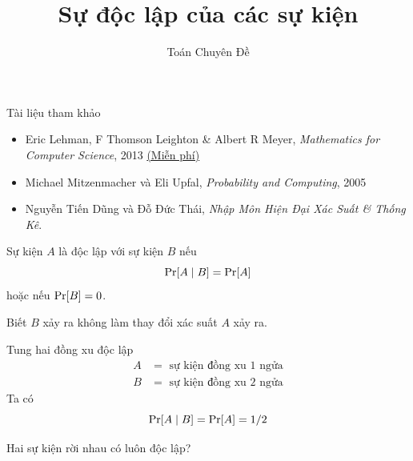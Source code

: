 
\title{Sự độc lập của các sự kiện} 
 \author{Toán Chuyên Đề}
 
\maketitle

\begin{frame}{Tài liệu tham khảo}  
  \begin{itemize}
  \item Eric Lehman, F Thomson Leighton \& Albert R Meyer,
    \textit{Mathematics for Computer Science}, 2013
    \href{https://www.seas.harvard.edu/courses/cs20/MIT6_042Notes.pdf}{\color{blue}(Miễn
    phí)}
  \item Michael Mitzenmacher và Eli Upfal, \textit{Probability and Computing}, 2005
  \item  Nguyễn Tiến Dũng và Đỗ Đức Thái, \textit{Nhập Môn Hiện Đại Xác Suất \& Thống Kê}.
  \end{itemize}
\end{frame} 

\begin{frame}
	\begin{dfntn}
		Sự kiện $A$ là độc lập với sự kiện $B$ nếu
		\[
			\mathrm{Pr}[A\mid B] = \mathrm{Pr}[A]
		\]
		hoặc nếu $\mathrm{Pr}[B] = 0$.
	\end{dfntn}
	Biết $B$ xảy ra không làm thay đổi xác suất  $A$ xảy ra.
\end{frame}

\begin{frame}
	\begin{xmpl}
		Tung hai đồng xu độc lập 
		\begin{align*}
			A &= \text{ sự kiện đồng xu $1$ ngửa}\\
			B &= \text{ sự kiện đồng xu $2$ ngửa}
		\end{align*}
	Ta có
	\[
		\mathrm{Pr}[A\mid B] = \mathrm{Pr}[A] = 1/2
	\]
	\end{xmpl}
	
\end{frame}

\begin{frame}
	\begin{qstn}
		Hai sự kiện rời nhau có luôn độc lập?
	\end{qstn}
	
\end{frame}


